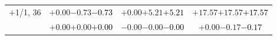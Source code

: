 \documentclass[compress]{beamer}
\begin{document}
\begin{frame}
\begin{tabular}{r | c | c | c}
$+$1/1, 36 & $+0.00$\hspace{0.1 cm}$-0.73$\hspace{0.1 cm}\textcolor{black}{$-0.73$} & $+0.00$\hspace{0.1 cm}$+5.21$\hspace{0.1 cm}\textcolor{black}{$+5.21$} & $+17.57$\hspace{0.1 cm}$+17.57$\hspace{0.1 cm}\textcolor{black}{$+17.57$} \\
           & $+0.00$\hspace{0.1 cm}$+0.00$\hspace{0.1 cm}\textcolor{black}{$+0.00$} & $-0.00$\hspace{0.1 cm}$-0.00$\hspace{0.1 cm}\textcolor{black}{$-0.00$} & $+0.00$\hspace{0.1 cm}$-0.17$\hspace{0.1 cm}\textcolor{black}{$-0.17$} \\
\end{tabular}
\end{frame}
\end{document}
